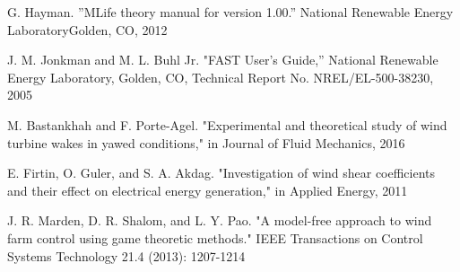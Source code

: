 \begin{thebibliography}{99}
 G. Hayman. ''MLife theory manual for version 1.00.'' National Renewable Energy LaboratoryGolden, CO, 2012
 
J. M. Jonkman and M. L. Buhl Jr. "FAST User's Guide,'' National Renewable Energy Laboratory, Golden, CO, Technical Report No. NREL/EL-500-38230, 2005

M. Bastankhah and F. Porte-Agel. "Experimental and theoretical study of wind turbine wakes in yawed conditions," in Journal of Fluid Mechanics, 2016

E. Firtin, O. Guler, and S. A. Akdag. "Investigation of wind shear coefficients and their effect on electrical energy generation," in Applied Energy, 2011

J. R. Marden, D. R. Shalom, and L. Y. Pao. "A model-free approach to wind farm control using game theoretic methods." IEEE Transactions on Control Systems Technology 21.4 (2013): 1207-1214	



\end{thebibliography}